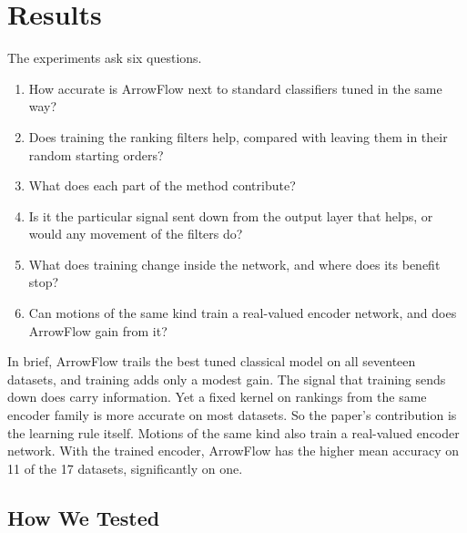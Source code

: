 \section{Results}\label{sec:experiments}

The experiments ask six questions.
\begin{enumerate}[leftmargin=2em,topsep=2pt,itemsep=1pt]
\item How accurate is ArrowFlow next to standard classifiers tuned in the same way?
\item Does training the ranking filters help, compared with leaving them in their random starting orders?
\item What does each part of the method contribute?
\item Is it the particular signal sent down from the output layer that helps, or would any movement of the filters do?
\item What does training change inside the network, and where does its benefit stop?
\item Can motions of the same kind train a real-valued encoder network, and does ArrowFlow gain from it?
\end{enumerate}

In brief, ArrowFlow trails the best tuned classical model on all seventeen datasets, and training adds only a modest gain. The signal that training sends down does carry information. Yet a fixed kernel on rankings from the same encoder family is more accurate on most datasets. So the paper's contribution is the learning rule itself. Motions of the same kind also train a real-valued encoder network. With the trained encoder, ArrowFlow has the higher mean accuracy on 11 of the 17 datasets, significantly on one.

\subsection{How We Tested}\label{sec:protocol}

